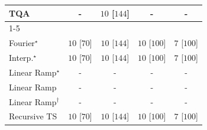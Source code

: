 \begin{tabular}{l|cccc|}
TQA & {\cellcolor[HTML]{000000}} \color[HTML]{F1F1F1} {\cellcolor{white}} \color{black} - & {\cellcolor[HTML]{00441B}} \color[HTML]{F1F1F1} $10$ [$144$] & {\cellcolor[HTML]{000000}} \color[HTML]{F1F1F1} {\cellcolor{white}} \color{black} - & {\cellcolor[HTML]{000000}} \color[HTML]{F1F1F1} {\cellcolor{white}} \color{black} - \\
\cline{1-5}
\multicolumn{5}{c}{\rule{0pt}{8pt}PP} \\
\midrule
Fourier$^\star$ & {\cellcolor[HTML]{00441B}} \color[HTML]{F1F1F1} $10$ [$70$] & {\cellcolor[HTML]{00441B}} \color[HTML]{F1F1F1} $10$ [$144$] & {\cellcolor[HTML]{00441B}} \color[HTML]{F1F1F1} $10$ [$100$] & {\cellcolor[HTML]{37A055}} \color[HTML]{F1F1F1} $7$ [$100$] \\
Interp.$^\star$ & {\cellcolor[HTML]{00441B}} \color[HTML]{F1F1F1} $10$ [$70$] & {\cellcolor[HTML]{00441B}} \color[HTML]{F1F1F1} $10$ [$144$] & {\cellcolor[HTML]{00441B}} \color[HTML]{F1F1F1} $10$ [$100$] & {\cellcolor[HTML]{37A055}} \color[HTML]{F1F1F1} $7$ [$100$] \\
Linear Ramp$^\star$ & {\cellcolor[HTML]{000000}} \color[HTML]{F1F1F1} {\cellcolor{white}} \color{black} - & {\cellcolor[HTML]{000000}} \color[HTML]{F1F1F1} {\cellcolor{white}} \color{black} - & {\cellcolor[HTML]{000000}} \color[HTML]{F1F1F1} {\cellcolor{white}} \color{black} - & {\cellcolor[HTML]{000000}} \color[HTML]{F1F1F1} {\cellcolor{white}} \color{black} - \\
Linear Ramp & {\cellcolor[HTML]{000000}} \color[HTML]{F1F1F1} {\cellcolor{white}} \color{black} - & {\cellcolor[HTML]{000000}} \color[HTML]{F1F1F1} {\cellcolor{white}} \color{black} - & {\cellcolor[HTML]{000000}} \color[HTML]{F1F1F1} {\cellcolor{white}} \color{black} - & {\cellcolor[HTML]{000000}} \color[HTML]{F1F1F1} {\cellcolor{white}} \color{black} - \\
Linear Ramp$^\dagger$ & {\cellcolor[HTML]{000000}} \color[HTML]{F1F1F1} {\cellcolor{white}} \color{black} - & {\cellcolor[HTML]{000000}} \color[HTML]{F1F1F1} {\cellcolor{white}} \color{black} - & {\cellcolor[HTML]{000000}} \color[HTML]{F1F1F1} {\cellcolor{white}} \color{black} - & {\cellcolor[HTML]{000000}} \color[HTML]{F1F1F1} {\cellcolor{white}} \color{black} - \\
Recursive TS & {\cellcolor[HTML]{00441B}} \color[HTML]{F1F1F1} $10$ [$70$] & {\cellcolor[HTML]{00441B}} \color[HTML]{F1F1F1} $10$ [$144$] & {\cellcolor[HTML]{00441B}} \color[HTML]{F1F1F1} $10$ [$100$] & {\cellcolor[HTML]{37A055}} \color[HTML]{F1F1F1} $7$ [$100$] \\

\end{tabular}
